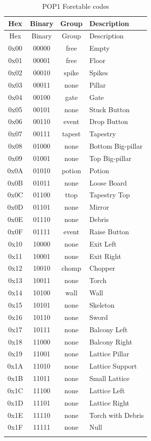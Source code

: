 \documentclass{article}
\begin{document}
\begin{longtable}{cccl}
\hline
 Hex & Binary& Group & Description \\
\hline
\endfirsthead
\hline
 Hex & Binary& Group & Description \\
\hline
\endhead
0x00 & 00000 & free  & Empty \\
0x01 & 00001 & free  & Floor \\
0x02 & 00010 & spike & Spikes \\
0x03 & 00011 & none  & Pillar \\
0x04 & 00100 & gate  & Gate \\
0x05 & 00101 & none  & Stuck Button \\
0x06 & 00110 & event & Drop Button \\
0x07 & 00111 & tapest& Tapestry \\
0x08 & 01000 & none  & Bottom Big-pillar \\
0x09 & 01001 & none  & Top Big-pillar \\
0x0A & 01010 & potion& Potion \\
0x0B & 01011 & none  & Loose Board \\
0x0C & 01100 & ttop  & Tapestry Top \\
0x0D & 01101 & none  & Mirror \\
0x0E & 01110 & none  & Debris \\
0x0F & 01111 & event & Raise Button \\
0x10 & 10000 & none  & Exit Left \\
0x11 & 10001 & none  & Exit Right \\
0x12 & 10010 & chomp & Chopper \\
0x13 & 10011 & none  & Torch \\
0x14 & 10100 & wall  & Wall \\
0x15 & 10101 & none  & Skeleton \\
0x16 & 10110 & none  & Sword \\
0x17 & 10111 & none  & Balcony Left \\
0x18 & 11000 & none  & Balcony Right \\
0x19 & 11001 & none  & Lattice Pillar \\
0x1A & 11010 & none  & Lattice Support \\
0x1B & 11011 & none  & Small Lattice \\
0x1C & 11100 & none  & Lattice Left \\
0x1D & 11101 & none  & Lattice Right \\
0x1E & 11110 & none  & Torch with Debris \\
0x1F & 11111 & none  & Null \\
\hline
\caption{POP1 Foretable codes}
\label{palettes table}
\end{longtable}
\end{document}
